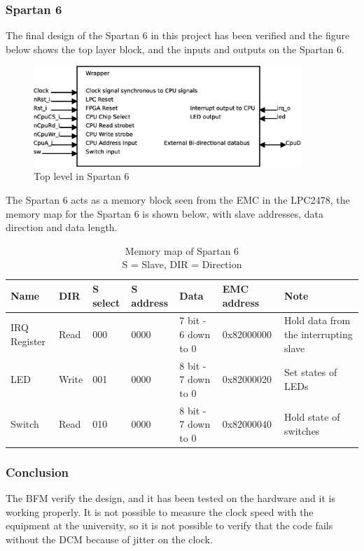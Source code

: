 \subsubsection{Spartan 6}
The final design of the Spartan 6 in this project has been verified and the figure below shows the top layer block, and the inputs and outputs on the Spartan 6.
\begin{figure}[H]
	\begin{centering}
		\includegraphics[width=0.9\textwidth]{images/tb7_wrapperblock.eps}
		\caption{Top level in Spartan 6}
	\end{centering}
\end{figure}
The Spartan 6 acts as a memory block seen from the EMC in the LPC2478, the memory map for the Spartan 6 is shown below, with slave addresses, data direction and data length.
\begin{table}[H]
    \begin{tabular}{|l|l|l|l|l|l|p{3.7cm}|}
        \hline
        Name         & DIR		 & S select 	& S address 	& Data                & EMC address & Note                                  \\ \hline
        IRQ Register & Read      & 000          & 0000          & 7 bit - 6 down to 0 & 0x82000000        & Hold data from the interrupting slave \\ \hline
        LED          & Write     & 001          & 0000          & 8 bit - 7 down to 0 & 0x82000020        & Set states of LEDs                    \\ \hline
        Switch       & Read      & 010          & 0000          & 8 bit - 7 down to 0 & 0x82000040        & Hold state of switches                \\
        \hline
    \end{tabular}
    \caption{Memory map of Spartan 6\\
    		 S = Slave, DIR = Direction}
\end{table}
\subsubsection{Conclusion}
The BFM verify the design, and it has been tested on the hardware and it is working properly. It is not possible to measure the clock speed with the equipment at the university, so it is not possible to verify that the code fails without the DCM because of jitter on the clock.
